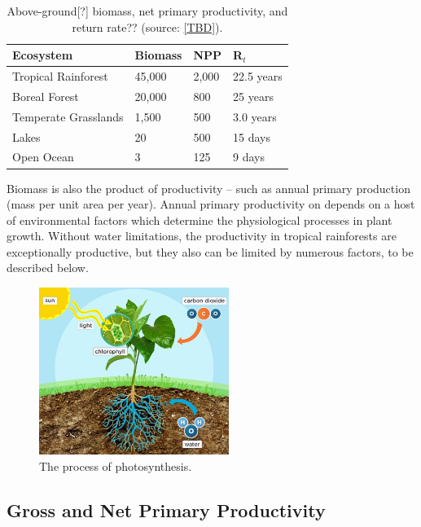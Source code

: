 \begin{table}[htb]
	\centering
	\caption{Above-ground[?] biomass, net primary productivity, and return rate?? (source: \ref{TBD}).}
	\label{tab:biomass}
		\begin{tabular}{llll}\hline
Ecosystem 						& Biomass	& NPP		& R$_t$ \\ \hline\hline

Tropical Rainforest		& 45,000	& 2,000	& 22.5 years \\
Boreal Forest					& 20,000	& 800		& 25 years \\
Temperate Grasslands	& 1,500		& 500		& 3.0 years \\
Lakes									& 20			& 500		& 15 days\\
Open Ocean						& 3				& 125		& 9 days \\ \hline	
		\end{tabular}

\end{table}
	
Biomass is also the product of productivity -- such as annual primary production (mass per unit area per year). Annual primary productivity  on depends on a host of environmental factors which determine the physiological processes in plant growth. Without water limitations, the productivity in tropical rainforests are exceptionally productive, but they also can be limited by numerous factors, to be described below. 

  \begin{figure}[ht]
    \centering
        \includegraphics[width = 0.55\textwidth]{graphics/photosynthesis.jpg}
        \caption{The process of photosynthesis.}
    \end{figure}
    

\subsection{Gross and Net Primary Productivity}

